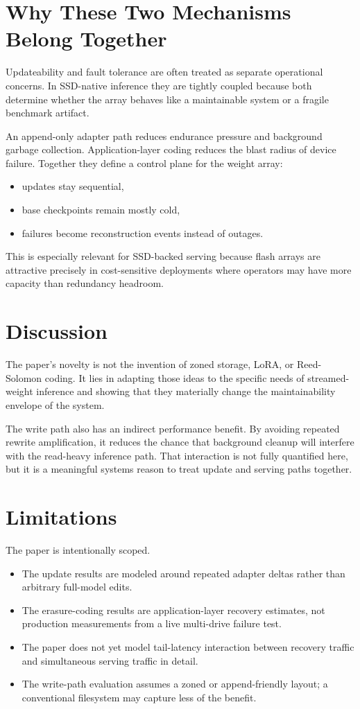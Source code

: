 \documentclass[11pt]{article}
\begin{document}
\section{Why These Two Mechanisms Belong Together}
Updateability and fault tolerance are often treated as separate operational concerns. In SSD-native inference they are tightly coupled because both determine whether the array behaves like a maintainable system or a fragile benchmark artifact.

An append-only adapter path reduces endurance pressure and background garbage collection. Application-layer coding reduces the blast radius of device failure. Together they define a control plane for the weight array:
\begin{itemize}
    \item updates stay sequential,
    \item base checkpoints remain mostly cold,
    \item failures become reconstruction events instead of outages.
\end{itemize}

This is especially relevant for SSD-backed serving because flash arrays are attractive precisely in cost-sensitive deployments where operators may have more capacity than redundancy headroom.

\section{Discussion}
The paper's novelty is not the invention of zoned storage, LoRA, or Reed-Solomon coding. It lies in adapting those ideas to the specific needs of streamed-weight inference and showing that they materially change the maintainability envelope of the system.

The write path also has an indirect performance benefit. By avoiding repeated rewrite amplification, it reduces the chance that background cleanup will interfere with the read-heavy inference path. That interaction is not fully quantified here, but it is a meaningful systems reason to treat update and serving paths together.

\section{Limitations}
The paper is intentionally scoped.
\begin{itemize}
    \item The update results are modeled around repeated adapter deltas rather than arbitrary full-model edits.
    \item The erasure-coding results are application-layer recovery estimates, not production measurements from a live multi-drive failure test.
    \item The paper does not yet model tail-latency interaction between recovery traffic and simultaneous serving traffic in detail.
    \item The write-path evaluation assumes a zoned or append-friendly layout; a conventional filesystem may capture less of the benefit.
\end{itemize}
\end{document}
